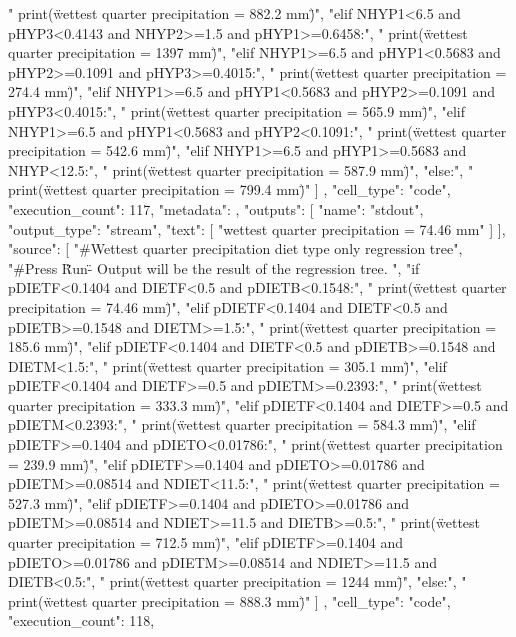 {{    "    print(\"wettest quarter precipitation = 882.2 mm\")\n",
    "elif NHYP1<6.5 and pHYP3<0.4143 and NHYP2>=1.5 and pHYP1>=0.6458:\n",
    "    print(\"wettest quarter precipitation = 1397 mm\")\n",
    "elif NHYP1>=6.5 and pHYP1<0.5683 and pHYP2>=0.1091 and pHYP3>=0.4015:\n",
    "    print(\"wettest quarter precipitation = 274.4 mm\")\n",
    "elif NHYP1>=6.5 and pHYP1<0.5683 and pHYP2>=0.1091 and pHYP3<0.4015:\n",
    "    print(\"wettest quarter precipitation = 565.9 mm\")\n",
    "elif NHYP1>=6.5 and pHYP1<0.5683 and pHYP2<0.1091:\n",
    "    print(\"wettest quarter precipitation = 542.6 mm\")\n",
    "elif NHYP1>=6.5 and pHYP1>=0.5683 and NHYP<12.5:\n",
    "    print(\"wettest quarter precipitation = 587.9 mm\")\n",
    "else:\n",
    "    print(\"wettest quarter precipitation = 799.4 mm\")"
   ]
  },
  {
   "cell_type": "code",
   "execution_count": 117,
   "metadata": {},
   "outputs": [
    {
     "name": "stdout",
     "output_type": "stream",
     "text": [
      "wettest quarter precipitation = 74.46 mm\n"
     ]
    }
   ],
   "source": [
    "#Wettest quarter precipitation diet type only regression tree\n",
    "#Press \"Run\" - Output will be the result of the regression tree. \n",
    "if pDIETF<0.1404 and DIETF<0.5 and pDIETB<0.1548:\n",
    "    print(\"wettest quarter precipitation = 74.46 mm\")\n",
    "elif pDIETF<0.1404 and DIETF<0.5 and pDIETB>=0.1548 and DIETM>=1.5:\n",
    "    print(\"wettest quarter precipitation = 185.6 mm\")\n",
    "elif pDIETF<0.1404 and DIETF<0.5 and pDIETB>=0.1548 and DIETM<1.5:\n",
    "    print(\"wettest quarter precipitation = 305.1 mm\")\n",
    "elif pDIETF<0.1404 and DIETF>=0.5 and pDIETM>=0.2393:\n",
    "    print(\"wettest quarter precipitation = 333.3 mm\")\n",
    "elif pDIETF<0.1404 and DIETF>=0.5 and pDIETM<0.2393:\n",
    "    print(\"wettest quarter precipitation = 584.3 mm\")\n",
    "elif pDIETF>=0.1404 and pDIETO<0.01786:\n",
    "    print(\"wettest quarter precipitation = 239.9 mm\")\n",
    "elif pDIETF>=0.1404 and pDIETO>=0.01786 and pDIETM>=0.08514 and NDIET<11.5:\n",
    "    print(\"wettest quarter precipitation = 527.3 mm\")\n",
    "elif pDIETF>=0.1404 and pDIETO>=0.01786 and pDIETM>=0.08514 and NDIET>=11.5 and DIETB>=0.5:\n",
    "    print(\"wettest quarter precipitation = 712.5 mm\")\n",
    "elif pDIETF>=0.1404 and pDIETO>=0.01786 and pDIETM>=0.08514 and NDIET>=11.5 and DIETB<0.5:\n",
    "    print(\"wettest quarter precipitation = 1244 mm\")\n",
    "else:\n",
    "    print(\"wettest quarter precipitation = 888.3 mm\")"
   ]
  },
  {
   "cell_type": "code",
   "execution_count": 118,
}}
